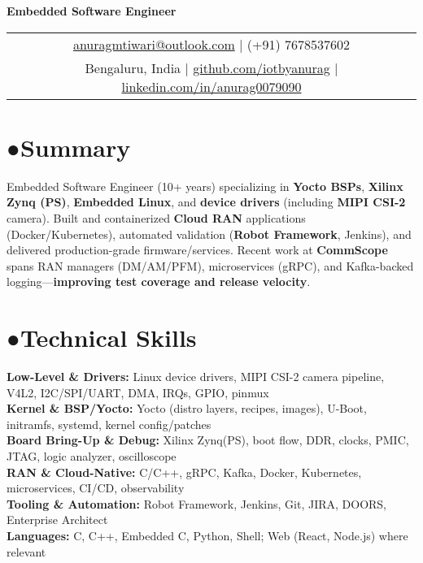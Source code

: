 \documentclass[11pt,a4paper]{article}
\newcommand{\faUser}{●}
\newcommand{\faWrench}{●}
\newcommand{\ressection}[2]{\section*{#2\hspace{0.5em}#1}}
\newcommand{\skillitem}[2]{
    \textbf{\color{accentcolor}#1:} #2\\[3pt]
}
\begin{document}
\begin{center}
    \vspace{4pt}
    
    {\large \textbf{Embedded Software Engineer}}\\[4pt]
    
    \begin{tabular}{c}
        \href{mailto:anuragmtiwari@outlook.com}{\color{accentcolor}anuragmtiwari@outlook.com} | {\color{darkGrey}(+91) 7678537602}\\
        {\color{darkGrey}Bengaluru, India} | \href{https://github.com/iotbyanurag}{\color{accentcolor}github.com/iotbyanurag} | \href{https://linkedin.com/in/anurag0079090}{\color{accentcolor}linkedin.com/in/anurag0079090}
    \end{tabular}
\end{center}

\vspace{8pt}

\ressection{Summary}{\faUser}
{\color{textcolor}
Embedded Software Engineer (10+ years) specializing in \textbf{Yocto BSPs}, \textbf{Xilinx Zynq (PS)}, \textbf{Embedded Linux}, and \textbf{device drivers} (including \textbf{MIPI CSI-2} camera). Built and containerized \textbf{Cloud RAN} applications (Docker/Kubernetes), automated validation (\textbf{Robot Framework}, Jenkins), and delivered production-grade firmware/services. Recent work at \textbf{CommScope} spans RAN managers (DM/AM/PFM), microservices (gRPC), and Kafka-backed logging—\textbf{improving test coverage and release velocity}.
}

\ressection{Technical Skills}{\faWrench}
{\color{textcolor}
\skillitem{Low-Level \& Drivers}{Linux device drivers, MIPI CSI-2 camera pipeline, V4L2, I2C/SPI/UART, DMA, IRQs, GPIO, pinmux}
\skillitem{Kernel \& BSP/Yocto}{Yocto (distro layers, recipes, images), U-Boot, initramfs, systemd, kernel config/patches}
\skillitem{Board Bring-Up \& Debug}{Xilinx Zynq(PS), boot flow, DDR, clocks, PMIC, JTAG, logic analyzer, oscilloscope}
\skillitem{RAN \& Cloud-Native}{C/C++, gRPC, Kafka, Docker, Kubernetes, microservices, CI/CD, observability}
\skillitem{Tooling \& Automation}{Robot Framework, Jenkins, Git, JIRA, DOORS, Enterprise Architect}
\skillitem{Languages}{C, C++, Embedded C, Python, Shell; Web (React, Node.js) where relevant}
}
\end{document}
